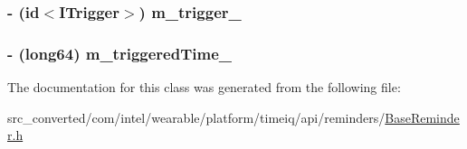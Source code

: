 \subsubsection[{m\+\_\+trigger\+\_\+}]{\setlength{\rightskip}{0pt plus 5cm}-\/ (id$<${\bf I\+Trigger}$>$) m\+\_\+trigger\+\_\+}\label{interface_base_reminder_a7224892c68e4067c1f6202126ddd3e59}
\hypertarget{interface_base_reminder_a77d288aac4cc1f3f082ca86e5f81786b}{}
\subsubsection[{m\+\_\+triggered\+Time\+\_\+}]{\setlength{\rightskip}{0pt plus 5cm}-\/ (long64) m\+\_\+triggered\+Time\+\_\+}\label{interface_base_reminder_a77d288aac4cc1f3f082ca86e5f81786b}


The documentation for this class was generated from the following file\+:\begin{DoxyCompactItemize}
\item 
src\+\_\+converted/com/intel/wearable/platform/timeiq/api/reminders/\hyperlink{_base_reminder_8h}{Base\+Reminder.\+h}\end{DoxyCompactItemize}
